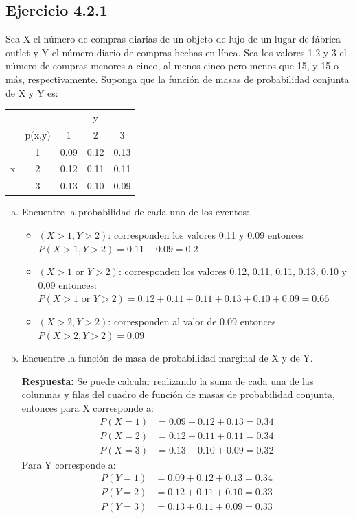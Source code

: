 \documentclass{article}\usepackage[]{graphicx}\usepackage[]{color}
\begin{document}
\subsection{Ejercicio 4.2.1}
Sea X el número de compras diarias de un objeto de lujo de un lugar de fábrica outlet y Y el número diario de compras hechas en línea. Sea los valores 1,2 y 3 el número de compras menores a cinco, al menos cinco pero menos que 15, y 15 o más, respectivamente. Suponga que la función de masas de probabilidad conjunta de X y Y es:
\begin{table}[h]
\centering
\begin{tabular}{cc|ccc}
                       &        &                           & y                         &      \\ \cline{3-5} 
                       & p(x,y) & \multicolumn{1}{c|}{1}    & \multicolumn{1}{c|}{2}    & 3    \\ \hline
\multicolumn{1}{c|}{}  & 1      & \multicolumn{1}{c|}{0.09} & \multicolumn{1}{c|}{0.12} & 0.13 \\ \hline
\multicolumn{1}{c|}{x} & 2      & \multicolumn{1}{c|}{0.12} & \multicolumn{1}{c|}{0.11} & 0.11 \\ \hline
\multicolumn{1}{c|}{}  & 3      & \multicolumn{1}{c|}{0.13} & \multicolumn{1}{c|}{0.10} & 0.09
\end{tabular}
\end{table}
\begin{enumerate}[(a)]
    \item Encuentre la probabilidad de cada uno de los eventos:
    \begin{itemize}
        \item $(X>1,Y>2)$: corresponden los valores 0.11 y 0.09 entonces $P(X>1,Y>2) = 0.11+0.09 = 0.2$
        \item $(X>1 \text{ or } Y>2)$: corresponden los valores 0.12, 0.11, 0.11, 0.13, 0.10 y 0.09 entonces: $P(X>1 \text{ or } Y>2) = 0.12+0.11+0.11+0.13+0.10+0.09 = 0.66$
        \item $(X > 2,Y > 2)$: corresponden al valor de 0.09 entonces $P(X > 2,Y > 2) = 0.09$
    \end{itemize}
    
    \item Encuentre la función de masa de probabilidad marginal de X y de Y.
    
    \textbf{Respuesta:} Se puede calcular realizando la suma de cada una de las columnas y filas del cuadro de función de masas de probabilidad conjunta, entonces para X corresponde a:
    \begin{align*}
        P(X=1) &= 0.09+0.12+0.13 = 0.34\\
        P(X=2) &= 0.12+0.11+0.11 = 0.34\\
        P(X=3) &= 0.13+0.10+0.09 = 0.32
    \end{align*}
    Para Y corresponde a:
    \begin{align*}
        P(Y=1) &= 0.09+0.12+0.13 = 0.34\\
        P(Y=2) &= 0.12+0.11+0.10 = 0.33\\
        P(Y=3) &= 0.13+0.11+0.09 = 0.33
    \end{align*}
    \end{enumerate}
\end{document}

